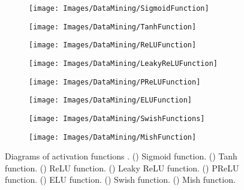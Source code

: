 \begin{figure}[h!]
	\centering
	
	\begin{subfigure}{0.22\textwidth}
		\texttt{[image: Images/DataMining/SigmoidFunction]}
		\caption{}    %
		\label{subfig:Sigmoid}
	\end{subfigure}
	\hfill
	\begin{subfigure}{0.22\textwidth}
		\texttt{[image: Images/DataMining/TanhFunction]}
		\caption{}    %
		\label{subfig:Tanh}
	\end{subfigure}
	\hfill
	\begin{subfigure}{0.22\textwidth}
		\texttt{[image: Images/DataMining/ReLUFunction]}
		\caption{}    %
		\label{subfig:ReLU}
	\end{subfigure}
	\hfill
	\begin{subfigure}{0.22\textwidth}
		\texttt{[image: Images/DataMining/LeakyReLUFunction]}
		\caption{}    %
		\label{subfig:LeakyReLU}
	\end{subfigure}
	
	\medskip
	
	\begin{subfigure}{0.22\textwidth}
		\texttt{[image: Images/DataMining/PReLUFunction]}
		\caption{}    %
		\label{subfig:PReLU}
	\end{subfigure}
	\hfill
	\begin{subfigure}{0.22\textwidth}
		\texttt{[image: Images/DataMining/ELUFunction]}
		\caption{}    %
		\label{subfig:ELU}
	\end{subfigure}
	\hfill
	\begin{subfigure}{0.22\textwidth}
		\texttt{[image: Images/DataMining/SwishFunctions]}
		\caption{}    %
		\label{subfig:Swish}
	\end{subfigure}
	\hfill
	\begin{subfigure}{0.22\textwidth}
		\texttt{[image: Images/DataMining/MishFunction]}
		\caption{}    %
		\label{subfig:Mish}
	\end{subfigure}
	
	\caption{Diagrams of activation functions \cite{Li:2021}.  () Sigmoid function.  () Tanh function. () ReLU function. () Leaky ReLU function. () PReLU function. () ELU function.  () Swish function. () Mish function.}
	\label{fig:activationFunctions}
\end{figure}

